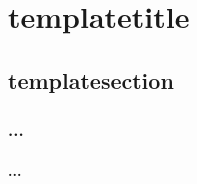 \documentclass[Ex4_Zusammenfassung.tex]{subfiles}
\begin{document}
	\chapter{templatetitle}
		\section{templatesection}
			\subsection*{...}
				\subsubsection*{...}
	
\end{document}

